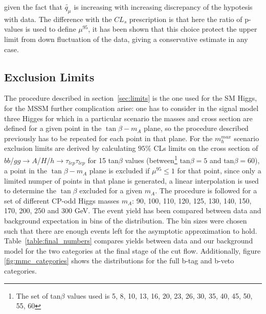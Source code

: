 given the fact that $\tilde{q_{\mu}}$ is increasing with increasing discrepancy of the hypotesis with data.
The difference with the $CL_{s}$ prescription is that here the ratio of p-values is used to define $\mu^{95}$, 
it has been shown that this choice protect the upper limit from down fluctuation of the data, giving a conservative
estimate in any case.
%
%
%	
%

\subsection{Exclusion Limits}
The procedure described in section~\ref{sec:limits} is  the one used for the SM Higgs, for the MSSM further complication
arise: one has to consider in the signal 
model three Higges for which in a particular scenario the masses and cross section are defined for a given point in the $\tan \beta - m_A$
plane, so the procedure described previously has to be repeated for each point in that plane. 
For the $m_h^{max}$ scenario exclusion limits are derived by calculating $95\%$ CLs limits on the cross section of
$bb$/$gg\to A$/$H$/$h\to\tau_{lep}\tau_{lep}$ for 15 tan$\beta$ values (between\footnote{The set of  tan$\beta$ values used
is 5, 8, 10, 13, 16, 20, 23, 26, 30, 35, 40, 45, 50, 55, 60}  $\mathrm{tan}\beta=5$ and $\mathrm{tan}\beta=60$),
a point in the  $\tan \beta - m_A$ plane is excluded if $\mu^{95} \leq 1$ for that point, 
since only a limited numper of points in that plane is generated, 
a linear interpolation is used to determine the $\tan \beta$ excluded for a given $m_A$.
The procedure is followed for a set of different CP-odd Higgs masses $m_A$: 90, 100, 110, 120, 125, 130,
140, 150, 170, 200, 250 and 300 GeV.
The event yield has been compared between data and background expectation in bins of the \mmc distribution. The bin sizes were chosen
such that there are enough events left for the asymptotic approximation \cite{CCGV} to  hold.
Table~\ref{table:final_numbers} compares yields between data and our background model for the two categories at the final
stage of the cut flow. Additionally, figure \ref{fig:mmc_categories} shows the \mmc distributions for the full b-tag and b-veto categories. 

